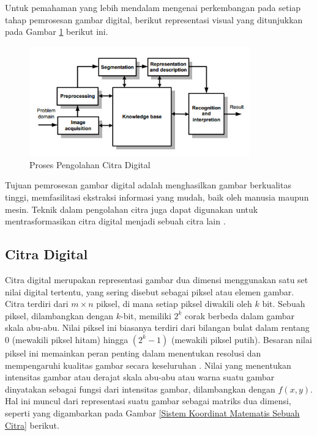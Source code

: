     
    
  Untuk pemahaman yang lebih mendalam mengenai perkembangan pada setiap tahap pemrosesan gambar digital, berikut representasi visual yang ditunjukkan pada Gambar \ref{Proses Dalam Pengolahan Citra Digital} berikut ini.


    \begin{figure}[H]
    \centering
    \includegraphics[width=0.85\textwidth]{figures/bab2/Block-diagram.jpg}
    \caption{Proses Pengolahan Citra Digital \cite{sathiya2017novel}}
    \label{Proses Dalam Pengolahan Citra Digital}
\end{figure}

    

    Tujuan pemrosesan gambar digital adalah menghasilkan gambar berkualitas tinggi, memfasilitasi ekstraksi informasi yang mudah, baik oleh manusia maupun mesin.
    Teknik dalam pengolahan citra juga dapat digunakan untuk mentrasformasikan citra digital menjadi sebuah citra lain \cite{Kirana2021}.  

\subsection{Citra Digital}

    Citra digital merupakan representasi gambar dua dimensi menggunakan satu set nilai digital tertentu,
     yang sering disebut sebagai piksel atau elemen gambar. Citra terdiri dari $m \times n$ piksel, di mana setiap
      piksel diwakili oleh $k$ bit. Sebuah piksel, dilambangkan dengan $k$-bit, memiliki $2^k$ corak berbeda dalam
       gambar skala abu-abu. Nilai piksel ini biasanya terdiri dari bilangan bulat dalam rentang 0
        (mewakili piksel hitam) hingga $(2^k - 1)$ (mewakili piksel putih). Besaran nilai piksel ini 
        memainkan peran penting dalam menentukan resolusi dan mempengaruhi kualitas gambar secara 
        keseluruhan \cite{book}. Nilai yang menentukan intensitas gambar atau derajat skala abu-abu atau warna 
         suatu gambar dinyatakan sebagai fungsi dari intensitas gambar, dilambangkan dengan $f(x, y)$. Hal ini
          muncul dari representasi suatu gambar sebagai matriks dua dimensi, seperti yang digambarkan
           pada Gambar \ref{Sistem Koordinat Matematis Sebuah Citra} \cite{Andono2018} berikut.

